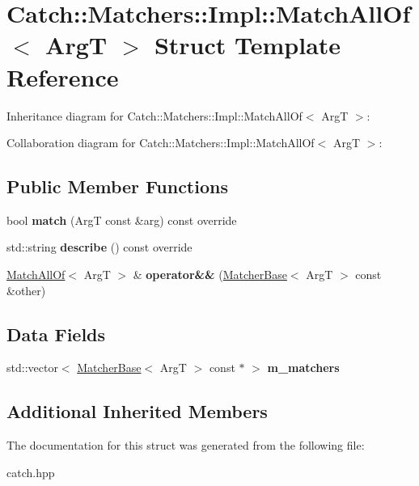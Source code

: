 \hypertarget{structCatch_1_1Matchers_1_1Impl_1_1MatchAllOf}{}\section{Catch\+:\+:Matchers\+:\+:Impl\+:\+:Match\+All\+Of$<$ ArgT $>$ Struct Template Reference}
\label{structCatch_1_1Matchers_1_1Impl_1_1MatchAllOf}


Inheritance diagram for Catch\+:\+:Matchers\+:\+:Impl\+:\+:Match\+All\+Of$<$ ArgT $>$\+:


Collaboration diagram for Catch\+:\+:Matchers\+:\+:Impl\+:\+:Match\+All\+Of$<$ ArgT $>$\+:
\subsection*{Public Member Functions}
\begin{DoxyCompactItemize}
\item 
\mbox{\label{structCatch_1_1Matchers_1_1Impl_1_1MatchAllOf_acfb377bda2c58ae62e6df9c3a8a89f8f}} 
bool {\bfseries match} (ArgT const \&arg) const override
\item 
\mbox{\label{structCatch_1_1Matchers_1_1Impl_1_1MatchAllOf_acbb9a083e93b546fd33c9235b644c40f}} 
std\+::string {\bfseries describe} () const override
\item 
\mbox{\label{structCatch_1_1Matchers_1_1Impl_1_1MatchAllOf_a9d0e38b36474336498d627610db434f3}} 
\hyperlink{structCatch_1_1Matchers_1_1Impl_1_1MatchAllOf}{Match\+All\+Of}$<$ ArgT $>$ \& {\bfseries operator\&\&} (\hyperlink{structCatch_1_1Matchers_1_1Impl_1_1MatcherBase}{Matcher\+Base}$<$ ArgT $>$ const \&other)
\end{DoxyCompactItemize}
\subsection*{Data Fields}
\begin{DoxyCompactItemize}
\item 
\mbox{\label{structCatch_1_1Matchers_1_1Impl_1_1MatchAllOf_a98d6a2611f195a4a5c49f92fd877be9a}} 
std\+::vector$<$ \hyperlink{structCatch_1_1Matchers_1_1Impl_1_1MatcherBase}{Matcher\+Base}$<$ ArgT $>$ const  $\ast$ $>$ {\bfseries m\+\_\+matchers}
\end{DoxyCompactItemize}
\subsection*{Additional Inherited Members}


The documentation for this struct was generated from the following file\+:\begin{DoxyCompactItemize}
\item 
catch.\+hpp\end{DoxyCompactItemize}
